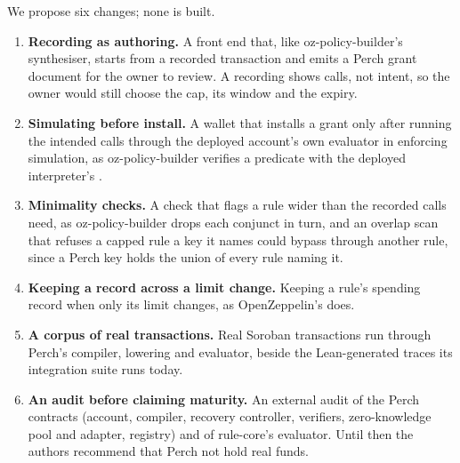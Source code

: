 We propose six changes; none is built.

\begin{enumerate}[leftmargin=*,itemsep=2pt]
\item \textbf{Recording as authoring.} A front end that, like oz-policy-builder's
synthesiser, starts from a recorded transaction and emits a Perch grant document
for the owner to review. A recording shows calls, not intent, so the owner would
still choose the cap, its window and the expiry.
\item \textbf{Simulating before install.} A wallet that installs a grant only
after running the intended calls through the deployed account's own evaluator in
enforcing simulation, as oz-policy-builder verifies a predicate with the deployed
interpreter's .
\item \textbf{Minimality checks.} A check that flags a rule wider than the
recorded calls need, as oz-policy-builder drops each conjunct in turn, and an
overlap scan that refuses a capped rule a key it names could bypass through
another rule, since a Perch key holds the union of every rule naming it.
\item \textbf{Keeping a record across a limit change.} Keeping a rule's
spending record when only its limit changes, as OpenZeppelin's
 does.
\item \textbf{A corpus of real transactions.} Real Soroban transactions run
through Perch's compiler, lowering and evaluator, beside the
 Lean-generated traces its integration suite runs today.
\item \textbf{An audit before claiming maturity.} An external audit of the
Perch contracts (account, compiler, recovery controller, verifiers,
zero-knowledge pool and adapter, registry) and of rule-core's evaluator. Until
then the authors recommend that Perch not hold real funds.
\end{enumerate}
